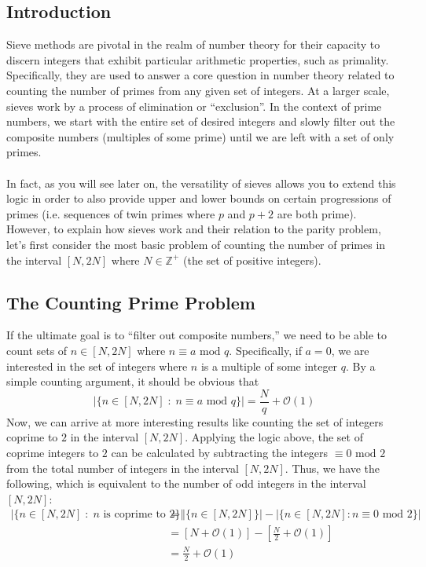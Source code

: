 \documentclass[8pt]{extarticle}
\begin{document}
\subsection{Introduction}
Sieve methods are pivotal in the realm of number theory for their capacity to discern integers that exhibit particular arithmetic properties, such as primality. 
Specifically, they are used to answer a core question in number theory related to counting the number of primes from any given set of integers. 
At a larger scale, sieves work by a process of elimination or ``exclusion''. In the context of prime numbers, we start with the entire set of desired integers and slowly filter out the composite numbers (multiples of some prime) until we are left with a set of only primes. \\
\\
In fact, as you will see later on, the versatility of sieves allows you to extend this logic in order to also provide upper and lower bounds on certain progressions of primes (i.e. sequences of twin primes where $p$ and $p+2$ are both prime).
However, to explain how sieves work and their relation to the parity problem, let's first consider the most basic problem of counting the number of primes in the interval $[N, 2N]$ where $N \in \mathbb{Z}^+$ (the set of positive integers). 
\subsection{The Counting Prime Problem}
If the ultimate goal is to ``filter out composite numbers,'' we need to be able to count sets of $n \in [N,2N]$ where $n \equiv a \text{ mod } q$. Specifically, if $a = 0$, we are interested in the set of integers where $n$ is a multiple of some integer $q$. By a simple counting argument, it should be obvious that
$$
\left|\{n \in [N,2N] \;:\; n \equiv a \text{ mod }q \}\right| = \frac{N}{q} + \mathcal{O}(1)
$$
Now, we can arrive at more interesting results like counting the set of integers coprime to $2$ in the interval $[N,2N]$. Applying the logic above, the set of coprime integers to $2$ can be calculated by subtracting the integers $\equiv 0 \text{ mod }2$ from the total number of integers in the interval $[N,2N]$. 
Thus, we have the following, which is equivalent to the number of odd integers in the interval $[N,2N]$:
\begin{align*}
\left|\{n \in [N,2N]\;:\; n \text{ is coprime to }2\}\right| &= \left|\{n \in [N,2N]\}\right| - \left|\{n \in [N,2N] : n \equiv 0 \text{ mod }2\}\right|\\
&= \left[N + \mathcal{O}(1)\right] - \left[\frac{N}{2} + \mathcal{O}(1)\right]\\
&= \frac{N}{2} + \mathcal{O}(1)
\end{align*}
\end{document}
